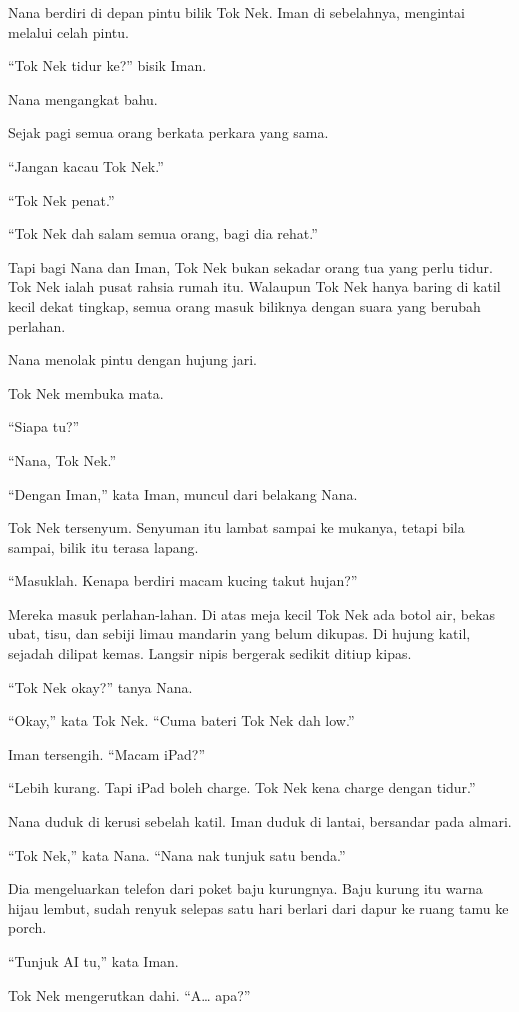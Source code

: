 \documentclass[
  11pt,
  a5paper,
  openany,
  oneside]{book}
\begin{document}
Nana berdiri di depan pintu bilik Tok Nek. Iman di sebelahnya, mengintai
melalui celah pintu.

``Tok Nek tidur ke?'' bisik Iman.

Nana mengangkat bahu.

Sejak pagi semua orang berkata perkara yang sama.

``Jangan kacau Tok Nek.''

``Tok Nek penat.''

``Tok Nek dah salam semua orang, bagi dia rehat.''

Tapi bagi Nana dan Iman, Tok Nek bukan sekadar orang tua yang perlu
tidur. Tok Nek ialah pusat rahsia rumah itu. Walaupun Tok Nek hanya
baring di katil kecil dekat tingkap, semua orang masuk biliknya dengan
suara yang berubah perlahan.

Nana menolak pintu dengan hujung jari.

Tok Nek membuka mata.

``Siapa tu?''

``Nana, Tok Nek.''

``Dengan Iman,'' kata Iman, muncul dari belakang Nana.

Tok Nek tersenyum. Senyuman itu lambat sampai ke mukanya, tetapi bila
sampai, bilik itu terasa lapang.

``Masuklah. Kenapa berdiri macam kucing takut hujan?''

Mereka masuk perlahan-lahan. Di atas meja kecil Tok Nek ada botol air,
bekas ubat, tisu, dan sebiji limau mandarin yang belum dikupas. Di
hujung katil, sejadah dilipat kemas. Langsir nipis bergerak sedikit
ditiup kipas.

``Tok Nek okay?'' tanya Nana.

``Okay,'' kata Tok Nek. ``Cuma bateri Tok Nek dah low.''

Iman tersengih. ``Macam iPad?''

``Lebih kurang. Tapi iPad boleh charge. Tok Nek kena charge dengan
tidur.''

Nana duduk di kerusi sebelah katil. Iman duduk di lantai, bersandar pada
almari.

``Tok Nek,'' kata Nana. ``Nana nak tunjuk satu benda.''

Dia mengeluarkan telefon dari poket baju kurungnya. Baju kurung itu
warna hijau lembut, sudah renyuk selepas satu hari berlari dari dapur ke
ruang tamu ke porch.

``Tunjuk AI tu,'' kata Iman.

Tok Nek mengerutkan dahi. ``A\ldots{} apa?''
\end{document}
